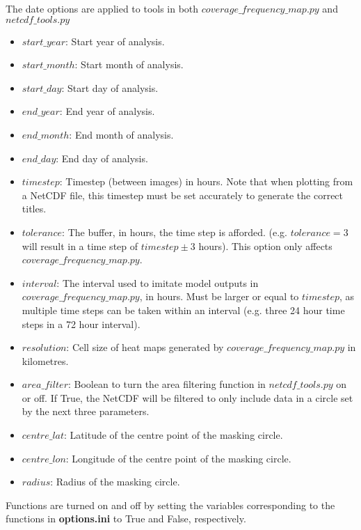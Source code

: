\documentclass{article}
\begin{document}
            The date options are applied to tools in both $coverage\_frequency\_map.py$ and $netcdf\_tools.py$
            \begin{itemize}
                \item $start\_year$: Start year of analysis.
                \item $start\_month$: Start month of analysis.
                \item $start\_day$: Start day of analysis.
                \item $end\_year$: End year of analysis.
                \item $end\_month$: End month of analysis.
                \item $end\_day$: End day of analysis.
                \item $timestep$: Timestep (between images) in hours. Note that when plotting from a NetCDF file, this timestep must be set accurately to generate the correct titles.
                \item $tolerance$: The buffer, in hours, the time step is afforded. (e.g. $tolerance = 3$ will result in a time step of $timestep \pm 3$ hours). This option only affects $coverage\_frequency\_map.py$.
                \item $interval$: The interval used to imitate model outputs in $coverage\_frequency\_map.py$, in hours. Must be larger or equal to $timestep$, as multiple time steps can be taken within an interval (e.g. three 24 hour time steps in a 72 hour interval).
                \item $resolution$: Cell size of heat maps generated by $coverage\_frequency\_map.py$ in kilometres.
                \item $area\_filter$: Boolean to turn the area filtering function in $netcdf\_tools.py$ on or off. If True, the NetCDF will be filtered to only include data in a circle set by the next three parameters.
                \item $centre\_lat$: Latitude of the centre point of the masking circle.
                \item $centre\_lon$: Longitude of the centre point of the masking circle.
                \item $radius$: Radius of the masking circle.
            \end{itemize}

            Functions are turned on and off by setting the variables corresponding to the functions in \textbf{options.ini} to True and False, respectively.
\end{document}
